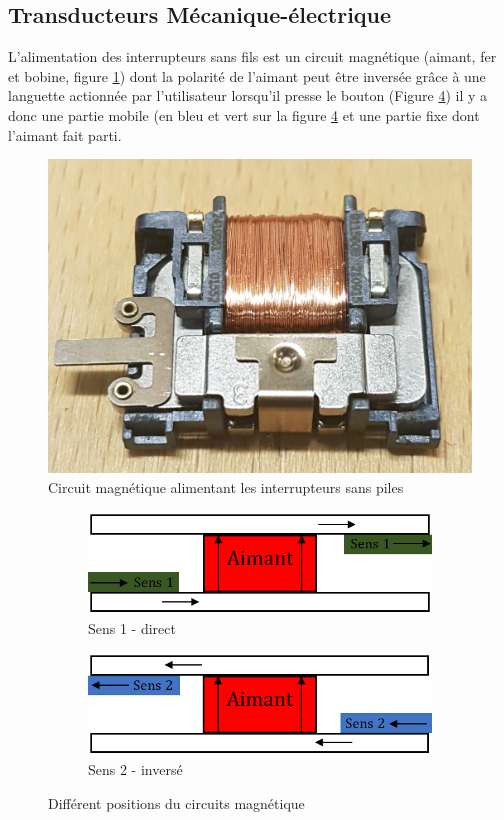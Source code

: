 \documentclass{rapportENS}
\begin{document}
 \subsection{Transducteurs Mécanique-électrique}
 
 L'alimentation des interrupteurs sans fils est un circuit magnétique (aimant, fer et bobine, figure \ref{photocircuitmag}) dont la polarité de l'aimant peut être inversée grâce à une languette actionnée par l'utilisateur lorsqu'il presse le bouton (Figure \ref{schemacircuitmag}) il y a donc une partie mobile (en bleu et vert sur la figure \ref{schemacircuitmag} et une partie fixe dont l'aimant fait parti.
 
 \begin{figure}[h!]
 \includegraphics[width = .3\linewidth]{circuitmag.jpg}
 \centering
 \caption{Circuit magnétique alimentant les interrupteurs sans piles}
 \label{photocircuitmag}
 \end{figure}
 
 \begin{figure}[h!]
 \begin{subfigure}{.5\linewidth}
 \centering
 \includegraphics[width=.9\linewidth]{sens1.PNG}
 \caption{Sens 1 - direct}
 \label{sens1}
 \end{subfigure}
 \begin{subfigure}{.5\linewidth}
 \centering
 \includegraphics[width=.9\linewidth]{sens2.PNG}
 \caption{Sens 2 - inversé}
 \label{sens2}
 \end{subfigure}
 \caption{Différent positions du circuits magnétique}
 \label{schemacircuitmag}
 \end{figure}
 
\end{document}
